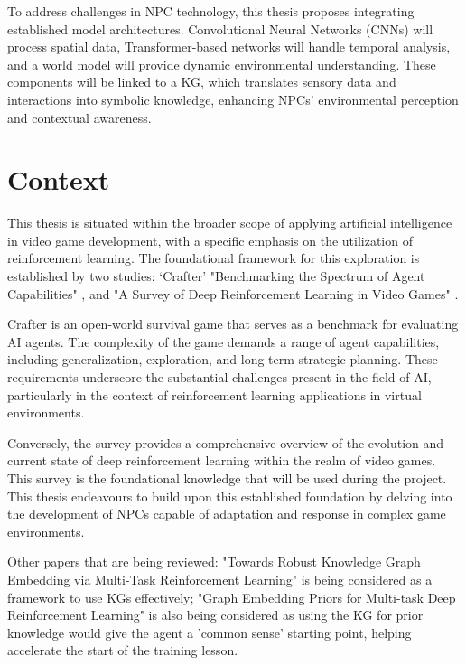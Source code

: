 \documentclass{article}
\begin{document}
To address challenges in NPC technology, this thesis proposes integrating established model architectures. Convolutional Neural Networks (CNNs) will process spatial data, Transformer-based networks will handle temporal analysis, and a world model will provide dynamic environmental understanding. These components will be linked to a KG, which translates sensory data and interactions into symbolic knowledge, enhancing NPCs' environmental perception and contextual awareness.


\section{Context}

This thesis is situated within the broader scope of applying artificial intelligence in video game development, with a specific emphasis on the utilization of reinforcement learning. The foundational framework for this exploration is established by two studies: ‘Crafter’ "Benchmarking the Spectrum of Agent Capabilities" \cite{Crafter}, and "A Survey of Deep Reinforcement Learning in Video Games" \cite{DRL_Survey}.

Crafter is an open-world survival game that serves as a benchmark for evaluating AI agents. The complexity of the game demands a range of agent capabilities, including generalization, exploration, and long-term strategic planning. These requirements underscore the substantial challenges present in the field of AI, particularly in the context of reinforcement learning applications in virtual environments.

Conversely, the survey provides a comprehensive overview of the evolution and current state of deep reinforcement learning within the realm of video games. This survey is the foundational knowledge that will be used during the project.
This thesis endeavours to build upon this established foundation by delving into the development of NPCs capable of adaptation and response in complex game environments. 

Other papers that are being reviewed: "Towards Robust Knowledge Graph Embedding via Multi-Task Reinforcement Learning" \cite{Robust_KG_Embedding} is being considered as a framework to use KGs effectively; "Graph Embedding Priors for Multi-task Deep Reinforcement Learning" \cite{Graph_Embedding_Priors} is also being considered as using the KG for prior knowledge would give the agent a 'common sense' starting point, helping accelerate the start of the training lesson.
\end{document}
